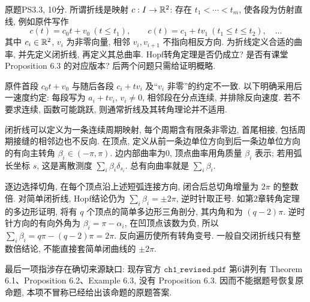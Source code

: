 \begin{exercise}\label{ps:3-3}
原题PS3.3, 10分. 所谓折线是映射 $c:I\to\mathbb R^2$: 存在 $t_1<\cdots<t_m$, 使各段为仿射直线, 例如原件写作
\[
 c(t)=c_0t+v_0\ (t\le t_1),\qquad c(t)=c_1+tv_1\ (t_1\le t\le t_2),\quad\ldots
\]
其中 $c_i\in\mathbb R^2$, $v_i$ 为非零向量, 相邻 $v_i,v_{i+1}$ 不指向相反方向. 为折线定义合适的曲率, 并先定义闭折线, 再定义其总曲率. Hopf转角定理是否仍成立? 是否有课堂 Proposition 6.3 的对应版本? 后两个问题只需给证明概略.
\end{exercise}
\begin{solution}\label{pssol:3-3}
原件首段 $c_0t+v_0$ 与随后各段 $c_i+tv_i$ 及“$v_i$ 非零”的约定不一致. 以下明确采用后一速度约定: 每段写为 $a_i+tv_i$, $v_i\ne0$, 相邻段在分点连续, 并排除反向速度. 若不要求连续, 函数可能跳跃, 则通常折线及其转角理论并不适用.

闭折线可以定义为一条连续周期映射, 每个周期含有限条非零边, 首尾相接, 包括周期接缝的相邻边也不反向. 在顶点, 定义从前一条边单位方向到后一条边单位方向的有向主转角 $\beta_i\in(-\pi,\pi)$. 边内部曲率为0, 顶点曲率用角质量 $\beta_i$ 表示; 若用弧长坐标 $s$, 这是离散测度 $\sum_i\beta_i\delta_{s_i}$. 总有向曲率就是 $\sum_i\beta_i$.

逐边选择切角, 在每个顶点沿上述短弧连接方向, 闭合后总切角增量为 $2\pi$ 的整数倍. 对简单闭折线, Hopf结论仍为 $\sum_i\beta_i=\pm2\pi$, 逆时针取正号. 如第2章转角定理的多边形证明, 将有 $q$ 个顶点的简单多边形三角剖分, 其内角和为 $(q-2)\pi$. 逆时针方向的有向外角为 $\beta_i=\pi-\alpha_i$, 在凹顶点该数为负, 所以 $\sum_i\beta_i=q\pi-(q-2)\pi=2\pi$. 反向遍历使所有转角变号. 一般自交闭折线只有整数倍结论, 不能直接套简单闭曲线的 $\pm2\pi$.

最后一项指涉存在确切来源缺口: 现存官方 $\texttt{ch1\_revised.pdf}$ 第6讲列有 Theorem 6.1、Proposition 6.2、Example 6.3, 没有 Proposition 6.3. 因而不能据题号恢复原命题, 本项不冒称已经给出该命题的原题答案.
\end{solution}

